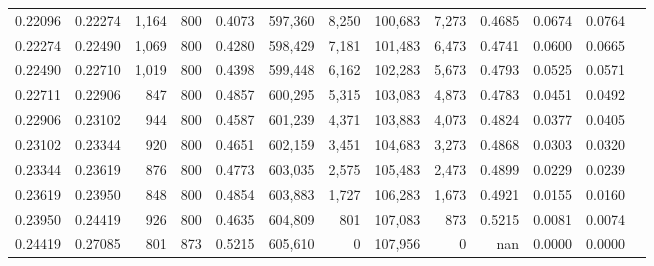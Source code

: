 \begin{tabular}{rrrrrrrrrrrrr}
0.22096 & 0.22274 &  1,164 & 800 &                                     0.4073 & 597,360 &   8,250 & 100,683 &   7,273 & 0.4685 & 0.0674 & 0.0764 \\
0.22274 & 0.22490 &  1,069 & 800 &                                     0.4280 & 598,429 &   7,181 & 101,483 &   6,473 & 0.4741 & 0.0600 & 0.0665 \\
0.22490 & 0.22710 &  1,019 & 800 &                                     0.4398 & 599,448 &   6,162 & 102,283 &   5,673 & 0.4793 & 0.0525 & 0.0571 \\
0.22711 & 0.22906 &    847 & 800 &                                     0.4857 & 600,295 &   5,315 & 103,083 &   4,873 & 0.4783 & 0.0451 & 0.0492 \\
0.22906 & 0.23102 &    944 & 800 &                                     0.4587 & 601,239 &   4,371 & 103,883 &   4,073 & 0.4824 & 0.0377 & 0.0405 \\
0.23102 & 0.23344 &    920 & 800 &                                     0.4651 & 602,159 &   3,451 & 104,683 &   3,273 & 0.4868 & 0.0303 & 0.0320 \\
0.23344 & 0.23619 &    876 & 800 &                                     0.4773 & 603,035 &   2,575 & 105,483 &   2,473 & 0.4899 & 0.0229 & 0.0239 \\
0.23619 & 0.23950 &    848 & 800 &                                     0.4854 & 603,883 &   1,727 & 106,283 &   1,673 & 0.4921 & 0.0155 & 0.0160 \\
0.23950 & 0.24419 &    926 & 800 &                                     0.4635 & 604,809 &     801 & 107,083 &     873 & 0.5215 & 0.0081 & 0.0074 \\
0.24419 & 0.27085 &    801 & 873 &                                     0.5215 & 605,610 &       0 & 107,956 &       0 &    nan & 0.0000 & 0.0000 \\
\bottomrule
\end{tabular}
